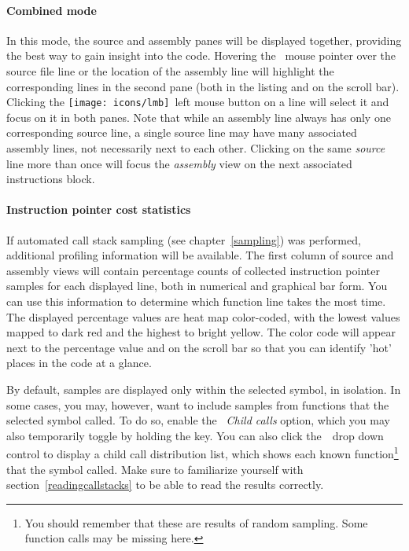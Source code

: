 \documentclass[hidelinks,titlepage,a4paper,twoside]{article}
\newcommand{\LMB}{\texttt{[image: icons/lmb]}}
\begin{document}
\paragraph{Combined mode}

In this mode, the source and assembly panes will be displayed together, providing the best way to gain insight into the code. Hovering the \faMousePointer{}~mouse pointer over the source file line or the location of the assembly line will highlight the corresponding lines in the second pane (both in the listing and on the scroll bar). Clicking the \LMB{}~left mouse button on a line will select it and focus on it in both panes. Note that while an assembly line always has only one corresponding source line, a single source line may have many associated assembly lines, not necessarily next to each other. Clicking on the same \emph{source} line more than once will focus the \emph{assembly} view on the next associated instructions block.

\paragraph{Instruction pointer cost statistics}

If automated call stack sampling (see chapter~\ref{sampling}) was performed, additional profiling information will be available. The first column of source and assembly views will contain percentage counts of collected instruction pointer samples for each displayed line, both in numerical and graphical bar form. You can use this information to determine which function line takes the most time. The displayed percentage values are heat map color-coded, with the lowest values mapped to dark red and the highest to bright yellow. The color code will appear next to the percentage value and on the scroll bar so that you can identify 'hot' places in the code at a glance.

By default, samples are displayed only within the selected symbol, in isolation. In some cases, you may, however, want to include samples from functions that the selected symbol called. To do so, enable the \emph{\faSignOut*{}~Child calls} option, which you may also temporarily toggle by holding the  key. You can also click the~\faCaretDown{}~drop down control to display a child call distribution list, which shows each known function\footnote{You should remember that these are results of random sampling. Some function calls may be missing here.} that the symbol called. Make sure to familiarize yourself with section~\ref{readingcallstacks} to be able to read the results correctly.
\end{document}
